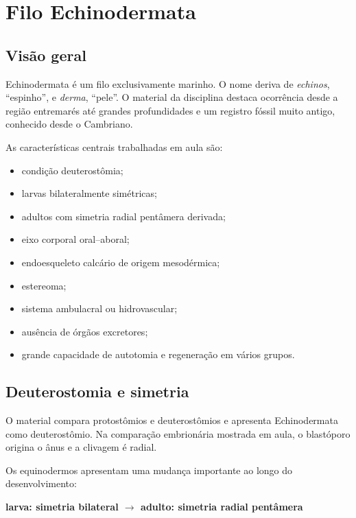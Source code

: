 \documentclass[a4paper,12pt]{article}
\begin{document}
\newpage

\section{Filo Echinodermata}

\subsection{Visão geral}

Echinodermata é um filo exclusivamente marinho. O nome deriva de \emph{echinos}, ``espinho'', e \emph{derma}, ``pele''. O material da disciplina destaca ocorrência desde a região entremarés até grandes profundidades e um registro fóssil muito antigo, conhecido desde o Cambriano.

As características centrais trabalhadas em aula são:

\begin{itemize}
  \item condição deuterostômia;
  \item larvas bilateralmente simétricas;
  \item adultos com simetria radial pentâmera derivada;
  \item eixo corporal oral--aboral;
  \item endoesqueleto calcário de origem mesodérmica;
  \item estereoma;
  \item sistema ambulacral ou hidrovascular;
  \item ausência de órgãos excretores;
  \item grande capacidade de autotomia e regeneração em vários grupos.
\end{itemize}

\subsection{Deuterostomia e simetria}

O material compara protostômios e deuterostômios e apresenta Echinodermata como deuterostômio. Na comparação embrionária mostrada em aula, o blastóporo origina o ânus e a clivagem é radial.

Os equinodermos apresentam uma mudança importante ao longo do desenvolvimento:

\begin{center}
\textbf{larva: simetria bilateral $\longrightarrow$ adulto: simetria radial pentâmera}
\end{center}
\end{document}
